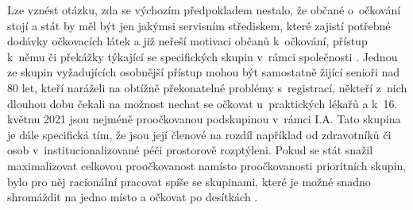 
Lze vznést otázku, zda se výchozím předpokladem nestalo, že občané o~očkování stojí a stát by měl být jen jakýmsi servisním střediskem, které zajistí potřebné dodávky očkovacích látek a již neřeší motivaci občanů k~očkování, přístup k~němu \cite{logoc_zpozdeni} či překážky týkající se specifických skupin v~rámci společnosti \cite{logoc_skvrny,logoc_romove}. %
Jednou ze skupin vyžadujících osobnější přístup mohou být samostatně žijící senioři nad 80 let, kteří naráželi na obtížně překonatelné problémy s~registrací, někteří z~nich dlouhou dobu čekali na možnost nechat se očkovat u~praktických lékařů a k~16. květnu 2021 jsou nejméně proočkovanou podskupinou v~rámci I.A. Tato skupina je dále specifická tím, že jsou její členové na rozdíl například od zdravotníků či osob v~institucionalizované péči prostorově rozptýleni. Pokud se stát snažil maximalizovat celkovou proočkovanost namísto proočkovanosti prioritních skupin, bylo pro něj racionální pracovat spíše se skupinami, které je možné snadno shromáždit na jedno místo a očkovat po desítkách \cite{blog_ucitele}.  









